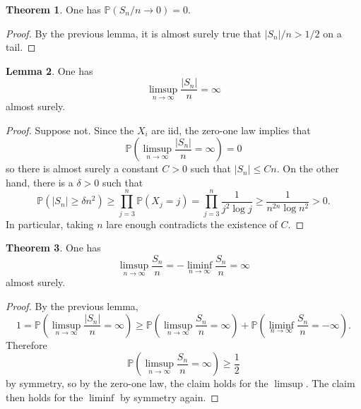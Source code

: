 \documentclass[10pt]{article}
\newcommand{\PP}{\mathbb P}
\theoremstyle{definition}
\newtheorem{lemma}{Lemma}[exer]
\newtheorem{theorem}[lemma]{Theorem}
\begin{document}
\begin{theorem}
One has $\PP(S_n/n \to 0) = 0$.
\end{theorem}
\begin{proof}
By the previous lemma, it is almost surely true that $|S_n|/n > 1/2$ on a tail.
\end{proof}

\begin{lemma}
One has
$$\limsup_{n \to \infty} \frac{|S_n|}{n} = \infty$$
almost surely.
\end{lemma}
\begin{proof}
Suppose not. Since the $X_i$ are iid, the zero-one law implies that
$$\PP\left(\limsup_{n \to \infty} \frac{|S_n|}{n} = \infty\right) = 0$$
so there is almost surely a constant $C > 0$ such that $|S_n| \leq Cn$.
On the other hand, there is a $\delta > 0$ such that
$$\PP(|S_n| \geq \delta n^2) \geq \prod_{j=3}^n \PP(X_j = j) = \prod_{j=3}^n \frac{1}{j^2 \log j} \geq \frac{1}{n^{2n} \log n^2} > 0.$$
In particular, taking $n$ lare enough contradicts the existence of $C$.
\end{proof}

\begin{theorem}
One has
$$\limsup_{n \to \infty} \frac{S_n}{n} = -\liminf_{n \to \infty} \frac{S_n}{n} = \infty$$
almost surely.
\end{theorem}
\begin{proof}
By the previous lemma,
$$1 = \PP\left(\limsup_{n \to \infty} \frac{|S_n|}{n} = \infty\right) \geq \PP\left(\limsup_{n \to \infty} \frac{S_n}{n} = \infty\right) + \PP\left(\liminf_{n \to \infty} \frac{S_n}{n} = -\infty\right).$$
Therefore
$$\PP\left(\limsup_{n \to \infty} \frac{S_n}{n} = \infty\right) \geq \frac{1}{2}$$
by symmetry, so by the zero-one law, the claim holds for the $\limsup$.
The claim then holds for the $\liminf$ by symmetry again.
\end{proof}
\end{document}
